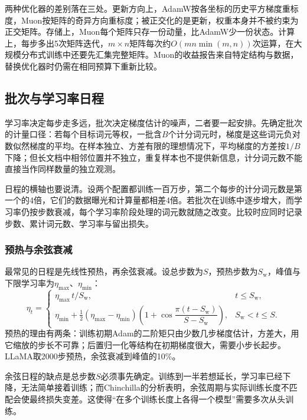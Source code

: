 两种优化器的差别落在三处。更新方向上，AdamW按各坐标的历史平方梯度重标度，Muon按矩阵的奇异方向重标度；被正交化的是更新，权重本身并不被约束为正交矩阵。存储上，Muon每个矩阵只存一份动量，比AdamW少一份状态。计算上，每步多出5次矩阵迭代，$m\times n$矩阵每次约$O(mn\min(m,n))$次运算，在大规模分布式训练中还要先汇集完整矩阵。Muon的收益报告来自特定结构与数据，替换优化器时仍需在相同预算下重新比较。

\subsection{批次与学习率日程}
\label{sec:nlp-llm-training-schedule}

学习率决定每步走多远，批次决定梯度估计的噪声，二者要一起安排。先确定批次的计量口径：若每个目标词元等权，一批含$B$个计分词元时，梯度是这些词元负对数似然梯度的平均。在样本独立、方差有限的理想情况下，平均梯度的方差按$1/B$下降；但长文档中相邻位置并不独立，重复样本也不提供新信息，计分词元数不能直接当作同样数量的独立观测。

日程的横轴也要说清。设两个配置都训练一百万步，第二个每步的计分词元数是第一个的4倍，它们的数据曝光和计算量都相差4倍。若批次在训练中逐步增大，而学习率仍按步数衰减，每个学习率阶段处理的词元数就随之改变。比较时应同时记录步数、累计词元数、学习率与留出损失。

\subsubsection{预热与余弦衰减}
\label{sec:nlp-llm-cosine}

最常见的日程是先线性预热，再余弦衰减。设总步数为$S$，预热步数为$S_{\mathrm w}$，峰值与下限学习率为$\eta_{\max}$、$\eta_{\min}$：
\begin{equation}
 \eta_t=
 \begin{cases}
  \eta_{\max}\,t/S_{\mathrm w}, & t\leq S_{\mathrm w},\\[2pt]
  \eta_{\min}+\tfrac12(\eta_{\max}-\eta_{\min})\left(1+\cos\dfrac{\pi(t-S_{\mathrm w})}{S-S_{\mathrm w}}\right), & S_{\mathrm w}<t\leq S.
 \end{cases}
 \label{eq:nlp-llm-cosine}
\end{equation}
预热的理由有两条：训练初期Adam的二阶矩只由少数几步梯度估计，方差大，用它缩放的步长不可靠；后置归一化等结构在初期梯度很大，需要小步长起步。LLaMA取2000步预热，余弦衰减到峰值的10\%。

余弦日程的缺点是总步数$S$必须事先确定。训练到一半若想延长，学习率已经下降，无法简单接着训练；而Chinchilla的分析表明，余弦周期与实际训练长度不匹配会使最终损失变差。这使得“在多个训练长度上各得一个模型”需要多次从头训练。

